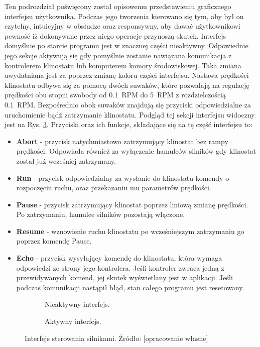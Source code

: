 Ten podrozdział poświęcony został opisowemu przedstawieniu graficznego interfejsu użytkownika. Podczas jego tworzenia kierowano się tym, aby był on czytelny, intuicyjny w obsłudze oraz responsywny, aby dawać użytkownikowi pewność iż dokonywane przez niego operacje przynoszą skutek. Interfejs domyślnie po starcie programu jest w znacznej części nieaktywny. Odpowiednie jego sekcje aktywują się gdy pomyślnie zostanie nawiązana komunikacja z kontrolerem klinostatu lub komputerem komory środowiskowej. Taka zmiana uwydatniana jest za poprzez zmianę koloru części interfejsu. Nastawa prędkości klinostatu odbywa się za pomocą dwóch suwaków, które pozwalają na regulację prędkości obu stopni swobody od \SI{0,1}{RPM} do \SI{5}{RPM} z rozdzielczością \SI{0,1}{RPM}. Bezpośrednio obok suwaków znajdują się przyciski odpowiedzialne za uruchomienie bądź zatrzymanie klinostatu. Podgląd tej sekcji interfejsu widoczny jest na Rys. \ref{fig:silniki_gui}. Przyciski oraz ich funkcje, składające się na tę część interfejsu to:
\begin{itemize}
	\item \textbf{Abort} - przycisk natychmiastowo zatrzymujący klinostat bez rampy prędkości. Odpowiada również za wyłączenie hamulców silników gdy klinostat został już wcześniej zatrzymany.
	\item \textbf{Run} - przycisk odpowiedzialny za wysłanie do klinostatu komendy o rozpoczęciu ruchu, oraz przekazaniu mu parametrów prędkości.
	\item \textbf{Pause} - przycisk zatrzymujący klinostat poprzez liniową zmianę prędkości. Po zatrzymaniu, hamulce silników pozostają włączone.
	\item \textbf{Resume} - wznowienie ruchu klinostatu po wcześniejszym zatrzymaniu go poprzez komendę Pause.
	\item \textbf{Echo} - przycisk wysyłający komendę do klinostatu, która wymaga odpowiedzi ze strony jego kontrolera. Jeśli kontroler zwraca jedną z przewidywanych komend, jej skutek wyświetlany jest w aplikacji. Jeśli podczas komunikacji nastąpił błąd, stan całego programu jest resetowany.
\end{itemize}

\begin{figure}
	\centering
	
	\begin{subfigure}[h]{.49\textwidth}
		\centering
			\setlength{\fboxsep}{0pt}
		\setlength{\fboxrule}{1pt}
		\caption{Nieaktywny interfejs.}
		\label{fig:silniki_gui_nieaktywne}
	\end{subfigure}
	\hfill%
	\begin{subfigure}[h]{.49\textwidth}
		\centering
		\setlength{\fboxsep}{0pt}
		\setlength{\fboxrule}{1pt}
		\caption{Aktywny interfejs.} 
		\label{fig:silniki_gui_aktywne}
	\end{subfigure}
	
	\caption{Interfejs sterowania silnikami. Źródło: [opracowanie własne]}
	\label{fig:silniki_gui}
	
\end{figure}

